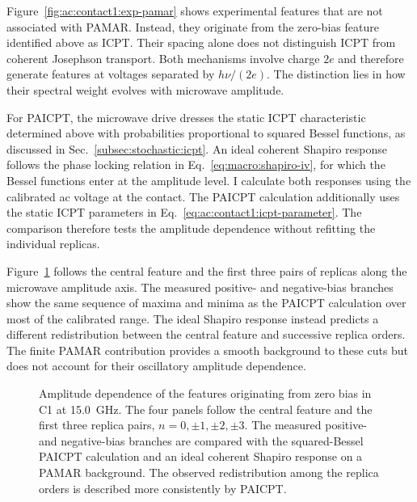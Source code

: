         Figure~\ref{fig:ac:contact1:exp-pamar} shows experimental features that are not associated with PAMAR. Instead, they originate from the zero-bias feature identified above as ICPT. Their spacing alone does not distinguish ICPT from coherent Josephson transport. Both mechanisms involve charge $2e$ and therefore generate features at voltages separated by $h\nu/(2e)$. The distinction lies in how their spectral weight evolves with microwave amplitude.

        For PAICPT, the microwave drive dresses the static ICPT characteristic determined above with probabilities proportional to squared Bessel functions, as discussed in Sec.~\ref{subsec:stochastic:icpt}. An ideal coherent Shapiro response follows the phase locking relation in Eq.~\eqref{eq:macro:shapiro-iv}, for which the Bessel functions enter at the amplitude level. I calculate both responses using the calibrated ac voltage at the contact. The PAICPT calculation additionally uses the static ICPT parameters in Eq.~\eqref{eq:ac:contact1:icpt-parameter}. The comparison therefore tests the amplitude dependence without refitting the individual replicas.

        Figure~\ref{fig:ac:contact1:didv-cuts} follows the central feature and the first three pairs of replicas along the microwave amplitude axis. The measured positive- and negative-bias branches show the same sequence of maxima and minima as the PAICPT calculation over most of the calibrated range. The ideal Shapiro response instead predicts a different redistribution between the central feature and successive replica orders. The finite PAMAR contribution provides a smooth background to these cuts but does not account for their oscillatory amplitude dependence.

        \begin{figure}[t]
            \centering
            \caption{
                Amplitude dependence of the features originating from zero bias in C1 at \qty{15.0}{\giga\hertz}. The four panels follow the central feature and the first three replica pairs, $n=0,\pm1,\pm2,\pm3$. The measured positive- and negative-bias branches are compared with the squared-Bessel PAICPT calculation and an ideal coherent Shapiro response on a PAMAR background. The observed redistribution among the replica orders is described more consistently by PAICPT.
            }
            \label{fig:ac:contact1:didv-cuts}
        \end{figure}


